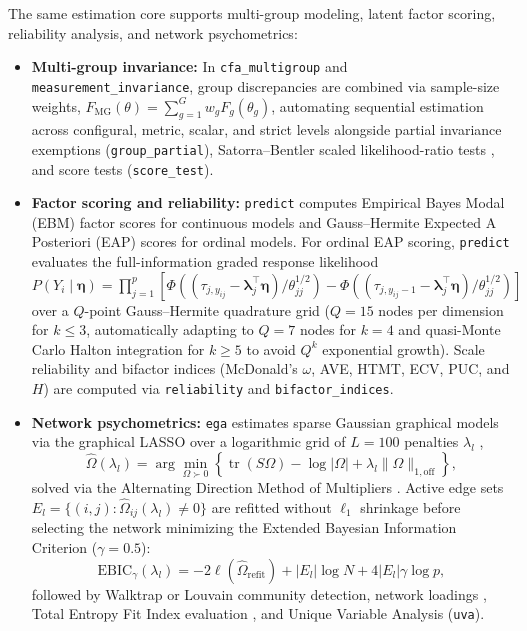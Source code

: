 ﻿\documentclass[12pt,letterpaper]{article}
\begin{document}
The same estimation core supports multi-group modeling, latent factor scoring, reliability analysis, and network psychometrics:
\begin{itemize}
    \item \textbf{Multi-group invariance:} In \texttt{cfa\_\allowbreak multigroup} and \texttt{measurement\_\allowbreak invariance}, group discrepancies are combined via sample-size weights, $F_{\mathrm{MG}}(\theta) = \sum_{g=1}^{G} w_g F_g(\theta_g)$, automating sequential estimation across configural, metric, scalar, and strict levels alongside partial invariance exemptions (\texttt{group\_\allowbreak partial}), Satorra--Bentler scaled likelihood-ratio tests \parencite[\texttt{compare\_models};][]{satorra2010}, and score tests (\texttt{score\_test}).
    \item \textbf{Factor scoring and reliability:} \texttt{predict} computes Empirical Bayes Modal (EBM) factor scores for continuous models and Gauss--Hermite Expected A Posteriori (EAP) scores for ordinal models. For ordinal EAP scoring, \texttt{predict} evaluates the full-information graded response likelihood $P(Y_i \mid \boldsymbol{\eta}) = \prod_{j=1}^p [\Phi((\tau_{j,y_{ij}} - \boldsymbol{\lambda}_j^{\top}\boldsymbol{\eta})/\theta_{jj}^{1/2}) - \Phi((\tau_{j,y_{ij}-1} - \boldsymbol{\lambda}_j^{\top}\boldsymbol{\eta})/\theta_{jj}^{1/2})]$ over a $Q$-point Gauss--Hermite quadrature grid ($Q = 15$ nodes per dimension for $k \le 3$, automatically adapting to $Q = 7$ nodes for $k = 4$ and quasi-Monte Carlo Halton integration for $k \ge 5$ to avoid $Q^k$ exponential growth). Scale reliability and bifactor indices (McDonald's $\omega$, AVE, HTMT, ECV, PUC, and $H$) are computed via \texttt{reliability} and \texttt{bifactor\_\allowbreak indices}.
    \item \textbf{Network psychometrics:} \texttt{ega} estimates sparse Gaussian graphical models via the graphical LASSO over a logarithmic grid of $L = 100$ penalties $\lambda_l$ \parencite{epskamp2018, foygel2010},
    \begin{equation}
    \hat{\Omega}(\lambda_l) = \arg\min_{\Omega \succ 0} \left\{ \operatorname{tr}(S\Omega) - \log|\Omega| + \lambda_l \|\Omega\|_{1,\mathrm{off}} \right\},
    \label{eq:glasso}
    \end{equation}
    solved via the Alternating Direction Method of Multipliers \parencite[ADMM, dual tolerance $10^{-6}$;][]{boyd2011}. Active edge sets $E_l = \{(i,j) : \hat{\Omega}_{ij}(\lambda_l) \neq 0\}$ are refitted without $\ell_1$ shrinkage before selecting the network minimizing the Extended Bayesian Information Criterion ($\gamma = 0.5$):
    \begin{equation}
    \mathrm{EBIC}_{\gamma}(\lambda_l) = -2\ell(\hat{\Omega}_{\mathrm{refit}}) + |E_l|\log N + 4|E_l|\gamma\log p,
    \label{eq:ebic}
    \end{equation}
    followed by Walktrap or Louvain community detection, network loadings \parencite{christensen2021}, Total Entropy Fit Index evaluation \parencite{golino2021}, and Unique Variable Analysis (\texttt{uva}).
\end{itemize}
\end{document}
